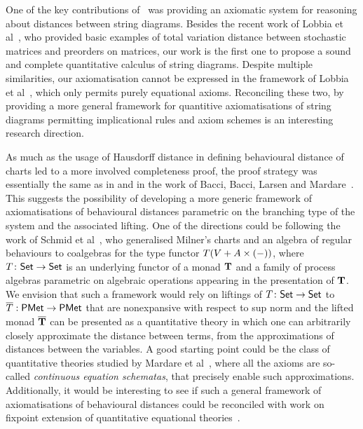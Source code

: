 One of the key contributions of~ was providing an axiomatic system for reasoning about distances between string diagrams. Besides the recent work of Lobbia et al~\cite{Lobbia:2024:Quantitative}, who provided basic examples of total variation distance between stochastic matrices and preorders on matrices, our work is the first one to propose a sound and complete quantitative calculus of string diagrams. Despite multiple similarities, our axiomatisation cannot be expressed in the framework of Lobbia et al~\cite{Lobbia:2024:Quantitative}, which only permits purely equational axioms. Reconciling these two, by providing a more general framework for quantitive axiomatisations of string diagrams permitting implicational rules and axiom schemes is an interesting research direction.

As much as the usage of Hausdorff distance in defining behavioural distance of charts led to a more involved completeness proof, the proof strategy was essentially the same as in  and in the work of Bacci, Bacci, Larsen and Mardare~\cite{Bacci:2018:Bisimilarity}. This suggests the possibility of developing a more generic framework of axiomatisations of behavioural distances parametric on the branching type of the system and the associated lifting. One of the directions could be following the work of Schmid et al~\cite{Schmid:2022:Processes}, who generalised Milner's charts and an algebra of regular behaviours to coalgebras for the type functor $T(V + {A} \times (-))$, where $T \colon {\mathsf{Set}} \to {\mathsf{Set}}$ is an underlying functor of a monad $\mathbf{T}$ and a family of process algebras parametric on algebraic operations appearing in the presentation of $\mathbf{T}$. We envision that such a framework would rely on liftings of $T \colon {\mathsf{Set}} \to {\mathsf{Set}}$ to $\overline{T} : \mathsf{PMet} \to \mathsf{PMet}$ that are nonexpansive with respect to sup norm and the lifted monad $\overline{\mathbf{T}}$ can be presented as a quantitative theory in which one can arbitrarily closely approximate the distance between terms, from the approximations of distances between the variables. A good starting point could be the class of quantitative theories studied by Mardare et al~\cite{Mardare:2016:Quantitative}, where all the axioms are so-called \emph{continuous equation schematas}, that precisely enable such approximations. Additionally, it would be interesting to see if such a general framework of axiomatisations of behavioural distances could be reconciled with work on fixpoint extension of quantitative equational theories~\cite{Mardare:2021:Fixed}. 
